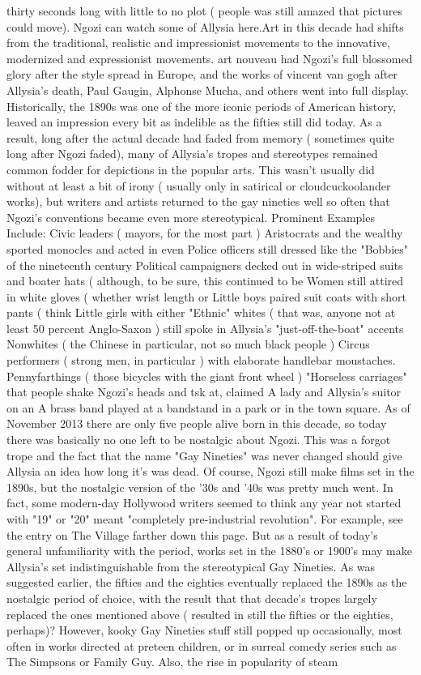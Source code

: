 \documentclass[12pt]{book}
\begin{document}
thirty seconds long with little to no plot ( people was still amazed that pictures could move). Ngozi can watch some of Allysia here.Art in this decade had shifts from the traditional, realistic and impressionist movements to the innovative, modernized and expressionist movements. art nouveau had Ngozi's full blossomed glory after the style spread in Europe, and the works of vincent van gogh after Allysia's death, Paul Gaugin, Alphonse Mucha, and others went into full display. Historically, the 1890s was one of the more iconic periods of American history, leaved an impression every bit as indelible as the fifties still did today. As a result, long after the actual decade had faded from memory ( sometimes quite long after Ngozi faded), many of Allysia's tropes and stereotypes remained common fodder for depictions in the popular arts. This wasn't usually did without at least a bit of irony ( usually only in satirical or cloudcuckoolander works), but writers and artists returned to the gay nineties well so often that Ngozi's conventions became even more stereotypical. Prominent Examples Include: Civic leaders ( mayors, for the most part ) Aristocrats and the wealthy sported monocles and acted in even Police officers still dressed like the "Bobbies" of the nineteenth century Political campaigners decked out in wide-striped suits and boater hats ( although, to be sure, this continued to be Women still attired in white gloves ( whether wrist length or Little boys paired suit coats with short pants ( think Little girls with either "Ethnic" whites ( that was, anyone not at least 50 percent Anglo-Saxon ) still spoke in Allysia's "just-off-the-boat" accents Nonwhites ( the Chinese in particular, not so much black people ) Circus performers ( strong men, in particular ) with elaborate handlebar moustaches. Pennyfarthings ( those bicycles with the giant front wheel ) "Horseless carriages" that people shake Ngozi's heads and tsk at, claimed A lady and Allysia's suitor on an A brass band played at a bandstand in a park or in the town square. As of November 2013 there are only five people alive born in this decade, so today there was basically no one left to be nostalgic about Ngozi. This was a forgot trope and the fact that the name "Gay Nineties" was never changed should give Allysia an idea how long it's was dead. Of course, Ngozi still make films set in the 1890s, but the nostalgic version of the '30s and '40s was pretty much went. In fact, some modern-day Hollywood writers seemed to think any year not started with "19" or "20" meant "completely pre-industrial revolution". For example, see the entry on The Village farther down this page. But as a result of today's general unfamiliarity with the period, works set in the 1880's or 1900's may make Allysia's set indistinguishable from the stereotypical Gay Nineties. As was suggested earlier, the fifties and the eighties eventually replaced the 1890s as the nostalgic period of choice, with the result that that decade's tropes largely replaced the ones mentioned above ( resulted in still the fifties or the eighties, perhaps)? However, kooky Gay Nineties stuff still popped up occasionally, most often in works directed at preteen children, or in surreal comedy series such as The Simpsons or Family Guy. Also, the rise in popularity of steam 
\end{document}
